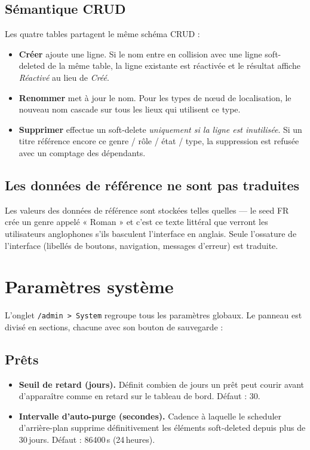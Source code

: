 \subsection*{Sémantique CRUD}

Les quatre tables partagent le même schéma CRUD :

\begin{itemize}
  \item \textbf{Créer} ajoute une ligne. Si le nom entre en collision
        avec une ligne soft-deleted de la même table, la ligne
        existante est réactivée et le résultat affiche
        \emph{Réactivé} au lieu de \emph{Créé}.
  \item \textbf{Renommer} met à jour le nom. Pour les types de nœud
        de localisation, le nouveau nom cascade sur tous les lieux
        qui utilisent ce type.
  \item \textbf{Supprimer} effectue un soft-delete \emph{uniquement
        si la ligne est inutilisée}. Si un titre référence encore
        ce genre / rôle / état / type, la suppression est refusée
        avec un comptage des dépendants.
\end{itemize}

\subsection*{Les données de référence ne sont pas traduites}

Les valeurs des données de référence sont stockées telles quelles —
le seed FR crée un genre appelé « Roman » et c'est ce texte
littéral que verront les utilisateurs anglophones s'ils basculent
l'interface en anglais. Seule l'ossature de l'interface
(libellés de boutons, navigation, messages d'erreur) est traduite.

\section{Paramètres système}\label{sec:system}

L'onglet \texttt{/admin > System} regroupe tous les paramètres
globaux. Le panneau est divisé en sections, chacune avec son bouton
de sauvegarde :

\subsection*{Prêts}

\begin{itemize}
  \item \textbf{Seuil de retard (jours).} Définit combien de jours
        un prêt peut courir avant d'apparaître comme en retard sur
        le tableau de bord. Défaut : 30.
  \item \textbf{Intervalle d'auto-purge (secondes).} Cadence à
        laquelle le scheduler d'arrière-plan supprime
        définitivement les éléments soft-deleted depuis plus de
        30\,jours. Défaut : 86400\,s (24\,heures).
\end{itemize}

